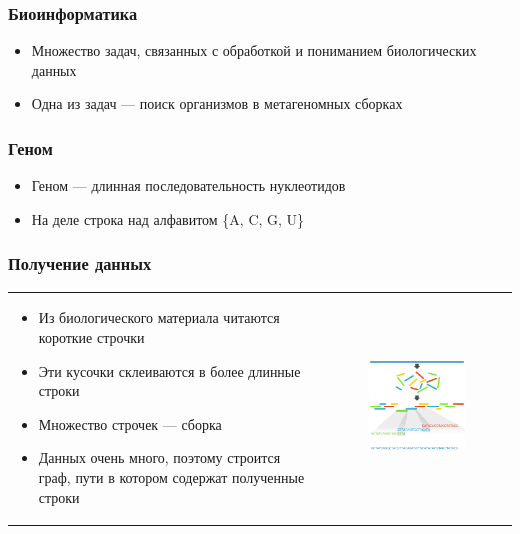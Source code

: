 \documentclass{beamer}
\begin{document}
\begin{frame}
	\frametitle{Биоинформатика}
	\begin{itemize}
		\item Множество задач, связанных с обработкой и пониманием биологических данных
		\item Одна из задач --- поиск организмов в метагеномных сборках
	\end{itemize}
\end{frame}

\begin{frame}
	\frametitle{Геном}
	\begin{itemize}
		\item Геном --- длинная последовательность нуклеотидов
		\item На деле строка над алфавитом \{A, C, G, U\}
	\end{itemize}
\end{frame}

\begin{frame}
	\frametitle{Получение данных}
	\begin{tabular}{p{5cm} p{7cm}}
		\begin{itemize}
			\item Из биологического материала читаются короткие строчки
			\item Эти кусочки склеиваются в более длинные строки
			\item Множество строчек --- сборка
			\item Данных очень много, поэтому строится граф, пути в котором содержат полученные строки
		\end{itemize}
		&
		\begin{figure}[b]
			\centering
			\includegraphics[width=6.5cm]{pictures/readsAssembly.png}  
		\end{figure}
	\end{tabular}
\end{frame}
\end{document}

